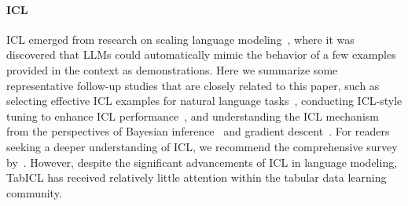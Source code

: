 \paragraph{ICL}
ICL emerged from research on scaling language modeling~\citep{kaplan2020ScalingLaws,Brown2020GPT-3}, where it was discovered that LLMs could automatically mimic the behavior of a few examples provided in the context as demonstrations.
Here we summarize some representative follow-up studies that are closely related to this paper, such as selecting effective ICL examples for natural language tasks~\citep{liu2021GoodICLExa,xu2023KNNPrompt}, conducting ICL-style tuning to enhance ICL performance~\citep{wei2022FLAN,gu2023Pre-trainICL}, and understanding the ICL mechanism from the perspectives of Bayesian inference~\citep{muller2021TransDoBayInf,xie2022explainICL} and gradient descent~\citep{dai2023ICLasGD}.
For readers seeking a deeper understanding of ICL, we recommend the comprehensive survey by~\citeauthor{dong2022SurveyICL}.
However, despite the significant advancements of ICL in language modeling, TabICL has received relatively little attention within the tabular data learning community.

